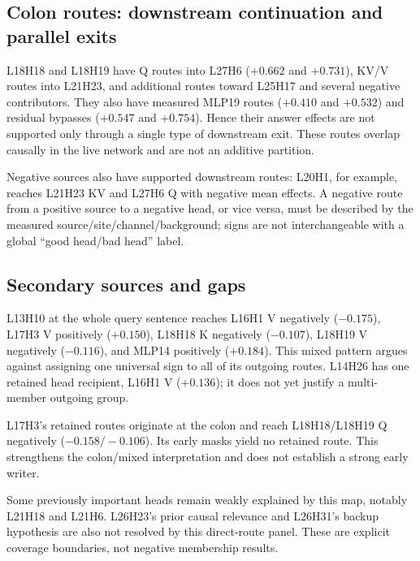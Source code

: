 \documentclass[11pt,a4paper]{article}
\newcommand{\file}[1]{\nolinkurl{#1}}
\begin{document}
\subsection{Colon routes: downstream continuation and parallel exits}
L18H18 and L18H19 have Q routes into L27H6 ($+0.662$ and $+0.731$), KV/V routes into L21H23, and additional routes toward L25H17 and several negative contributors. They also have measured MLP19 routes ($+0.410$ and $+0.532$) and residual bypasses ($+0.547$ and $+0.754$). Hence their answer effects are not supported only through a single type of downstream exit. These routes overlap causally in the live network and are not an additive partition.

Negative sources also have supported downstream routes: L20H1, for example, reaches L21H23 KV and L27H6 Q with negative mean effects. A negative route from a positive source to a negative head, or vice versa, must be described by the measured source/site/channel/background; signs are not interchangeable with a global ``good head/bad head'' label.

\subsection{Secondary sources and gaps}
L13H10 at the whole query sentence reaches L16H1 V negatively ($-0.175$), L17H3 V positively ($+0.150$), L18H18 K negatively ($-0.107$), L18H19 V negatively ($-0.116$), and MLP14 positively ($+0.184$). This mixed pattern argues against assigning one universal sign to all of its outgoing routes. L14H26 has one retained head recipient, L16H1 V ($+0.136$); it does not yet justify a multi-member outgoing group.

L17H3's retained routes originate at the colon and reach L18H18/L18H19 Q negatively ($-0.158/-0.106$). Its early masks yield no retained route. This strengthens the colon/mixed interpretation and does not establish a strong early writer.

Some previously important heads remain weakly explained by this map, notably L21H18 and L21H6. L26H23's prior causal relevance and L26H31's backup hypothesis are also not resolved by this direct-route panel. These are explicit coverage boundaries, not negative membership results.

\begin{table}[htbp]\centering\small

\caption{Selected extended routes in logits. $I_{89}$ and $J_{89}$ average 89 family means; $I_{69}$ uses only the additional families. ``Union'' means query-mother, \texttt{is} and period; ``sentence'' is the query fact. Numerical details, intervals and all 96 configurations are provided in \file{data/route_ledger_96.csv} and \file{data/extension_population_summary.csv}.}
\label{tab:routes}
\end{table}
\FloatBarrier
\end{document}
